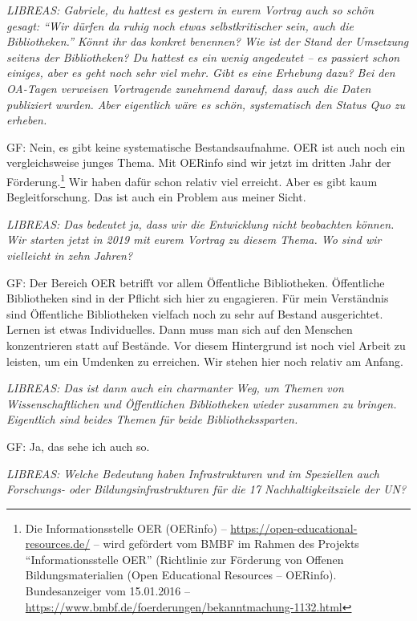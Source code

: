 \documentclass[a4paper,
fontsize=11pt,
oneside,
numbers=noperiodatend,
parskip=half-,
bibliography=totoc,
final
]{scrartcl}
\begin{document}
\emph{LIBREAS: Gabriele, du hattest es gestern in eurem Vortrag auch so
schön gesagt: \enquote{Wir dürfen da ruhig noch etwas selbstkritischer sein,
auch die Bibliotheken.} Könnt ihr das konkret benennen? Wie ist der
Stand der Umsetzung seitens der Bibliotheken? Du hattest es ein wenig
angedeutet -- es passiert schon einiges, aber es geht noch sehr viel
mehr. Gibt es eine Erhebung dazu? Bei den OA-Tagen verweisen Vortragende
zunehmend darauf, dass auch die Daten publiziert wurden. Aber eigentlich
wäre es schön, systematisch den Status Quo zu erheben.}

GF: Nein, es gibt keine systematische Bestandsaufnahme. OER ist auch
noch ein vergleichsweise junges Thema. Mit OERinfo sind wir jetzt im
dritten Jahr der Förderung.\footnote{Die Informationsstelle OER
  (OERinfo) -- \url{https://open-educational-resources.de/} -- wird
  gefördert vom BMBF im Rahmen des Projekts \enquote{Informationsstelle OER}
  (Richtlinie zur Förderung von Offenen Bildungsmaterialien (Open
  Educational Resources -- OERinfo). Bundesanzeiger vom 15.01.2016 --
  \url{https://www.bmbf.de/foerderungen/bekanntmachung-1132.html}} Wir
haben dafür schon relativ viel erreicht. Aber es gibt kaum
Begleitforschung. Das ist auch ein Problem aus meiner Sicht.

\emph{LIBREAS: Das bedeutet ja, dass wir die Entwicklung nicht
beobachten können. Wir starten jetzt in 2019 mit eurem Vortrag zu diesem
Thema. Wo sind wir vielleicht in zehn Jahren?}

GF: Der Bereich OER betrifft vor allem Öffentliche Bibliotheken.
Öffentliche Bibliotheken sind in der Pflicht sich hier zu engagieren.
Für mein Verständnis sind Öffentliche Bibliotheken vielfach noch zu sehr
auf Bestand ausgerichtet. Lernen ist etwas Individuelles. Dann muss man
sich auf den Menschen konzentrieren statt auf Bestände. Vor diesem
Hintergrund ist noch viel Arbeit zu leisten, um ein Umdenken zu
erreichen. Wir stehen hier noch relativ am Anfang.

\emph{LIBREAS: Das ist dann auch ein charmanter Weg, um Themen von
Wissenschaftlichen und Öffentlichen Bibliotheken wieder zusammen zu
bringen. Eigentlich sind beides Themen für beide Bibliothekssparten.}

GF: Ja, das sehe ich auch so.

\emph{LIBREAS: Welche Bedeutung haben Infrastrukturen und im Speziellen
auch Forschungs- oder Bildungsinfrastrukturen für die 17
Nachhaltigkeitsziele der UN?}
\end{document}
